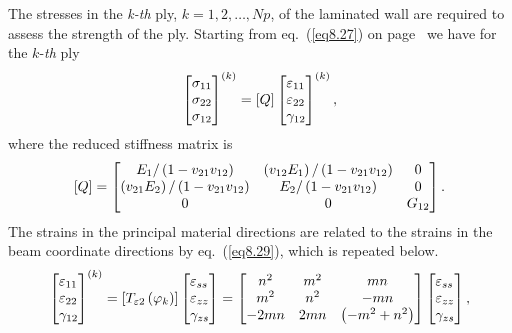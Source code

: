 \documentclass{AeroStructure-ERJohnson}
\begin{document}
The stresses in the \textit{k-th} ply, $k=1,2, \ldots, N p$, of the laminated wall are required to assess the strength of the ply. Starting from eq.~(\ref{eq8.27}) on page~\pageref{eq8.27} we have for the $k$-\textit{th} ply
\begin{align}\label{eq9.54}
\left[\begin{array}{@{}l@{}}\sigma_{11} \\\sigma_{22} \\\sigma_{12}\end{array}\right]^{(k)}=[Q]\left[\begin{array}{@{}l@{}}\varepsilon_{11} \\\varepsilon_{22} \\\gamma_{12}\end{array}\right]^{(k)},
\end{align}
where the reduced stiffness matrix is
\begin{align}\label{eq9.55}
[Q]=\left[\begin{array}{@{}ccc@{}}E_{1} /\left(1-v_{21} v_{12}\right) & \left(v_{12} E_{1}\right) /\left(1-v_{21} v_{12}\right) & 0 \\\left(v_{21} E_{2}\right) /\left(1-v_{21} v_{12}\right) & E_{2} /\left(1-v_{21} v_{12}\right) & 0 \\0 & 0 & G_{12}\end{array}\right].
\end{align}
The strains in the principal material directions are related to the strains in the beam coordinate directions by eq.~(\ref{eq8.29}), which is repeated below.
\begin{align}\label{eq9.56}
\left[\begin{array}{@{}l@{}}\varepsilon_{11} \\\varepsilon_{22} \\\gamma_{12}\end{array}\right]^{(k)}=\left[T_{\varepsilon 2}\left(\varphi_{k}\right)\right]\left[\begin{array}{@{}l@{}}\varepsilon_{s s} \\\varepsilon_{z z} \\\gamma_{z s}\end{array}\right]=\left[\begin{array}{@{}ccc@{}}n^{2} & m^{2} & m n \\m^{2} & n^{2} & -m n \\-2 m n & 2 m n & \left(-m^{2}+n^{2}\right)\end{array}\right]\left[\begin{array}{@{}l@{}}\varepsilon_{s s} \\\varepsilon_{z z} \\\gamma_{z s}\end{array}\right],
\end{align}
\end{document}
